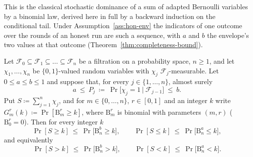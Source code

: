 
This is the classical stochastic dominance of a sum of adapted Bernoulli
variables by a binomial law, derived here in full by a backward induction on
the conditional tail. Under Assumption~\ref{ass:hon-env} the indicators of
one outcome over the rounds of an honest run are such a sequence, with $a$
and $b$ the envelope's two values at that outcome (Theorem~\ref{thm:completeness-bound}).

\begin{lemma}\label{lem:envelope-dominance}
Let $\mathcal{F}_0\subseteq\mathcal{F}_1\subseteq\dots\subseteq\mathcal{F}_n$
be a filtration on a probability space, $n\ge1$, and let
$\chi_1,\dots,\chi_n$ be $\{0,1\}$-valued random variables with $\chi_j$
$\mathcal{F}_j$-measurable. Let $0\le a\le b\le1$ and suppose that, for every
$j\in\{1,\dots,n\}$, almost surely
\begin{equation}\label{eq:dominance-hyp}
  a\ \le\ P_j\ \coloneqq\ \Pr\big[\chi_j=1\ \big|\ \mathcal{F}_{j-1}\big]\ \le\ b .
\end{equation}
Put $S\coloneqq\sum_{j=1}^{n}\chi_j$, and for $m\in\{0,\dots,n\}$,
$r\in[0,1]$ and an integer $k$ write
$G^{r}_{m}(k)\coloneqq\Pr[\mathrm{B}^{r}_{m}\ge k]$, where
$\mathrm{B}^{r}_{m}$ is binomial with parameters $(m,r)$ ($\mathrm{B}^{r}_{0}=0$).
Then for every integer $k$
\begin{equation}\label{eq:dominance}
  \Pr[S\ge k]\ \le\ \Pr\big[\mathrm{B}^{b}_{n}\ge k\big],
  \qquad
  \Pr[S\le k]\ \le\ \Pr\big[\mathrm{B}^{a}_{n}\le k\big],
\end{equation}
and equivalently
\begin{equation}\label{eq:dominance-strict}
  \Pr[S>k]\ \le\ \Pr\big[\mathrm{B}^{b}_{n}>k\big],
  \qquad
  \Pr[S<k]\ \le\ \Pr\big[\mathrm{B}^{a}_{n}<k\big].
\end{equation}
\end{lemma}

